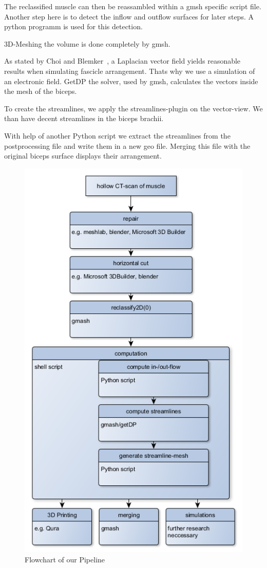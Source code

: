 \documentclass[preprint,journal]{vgtc}       %
\begin{document}
The reclassified muscle can then be reassambled within a gmsh specific script file. Another step here is to detect the inflow and outflow surfaces for later steps. A python programm is used for this detection. 

3D-Meshing the volume is done completely by gmsh.
 
As stated by Choi and Blemker~\cite{Choi2013}, a Laplacian vector field yields reasonable results when simulating fascicle arrangement. Thats why we use a simulation of an electronic field. GetDP the solver, used by gmsh, calculates the vectors  inside the mesh of the biceps.

To create the streamlines, we apply the streamlines-plugin on the vector-view. We than have decent streamlines in the biceps brachii.

With help of another Python script we extract the streamlines from the postprocessing file and write them in a new geo file. Merging this file with the original biceps surface displays their arrangement.
\begin{figure}
	\begin{center}
		\includegraphics[width=.7\linewidth]{flow.png}
	\end{center}
	\caption{Flowchart of our Pipeline}
	\label{fig:flow}
	
\end{figure}
\end{document}

